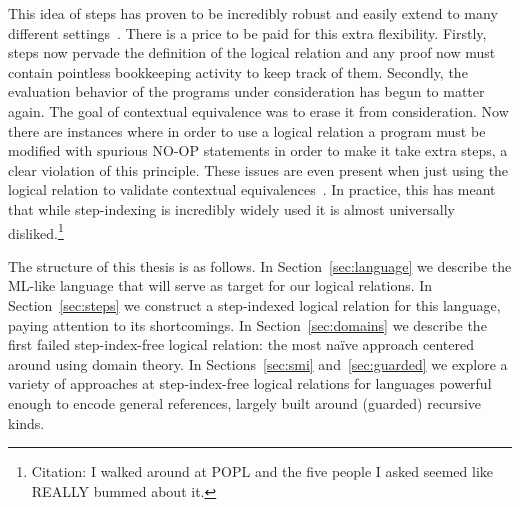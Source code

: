 This idea of steps has proven to be incredibly robust and easily
extend to many different
settings~\citep{Appel:01,Ahmed:04,Ahmed:06,Appel:07,Dreyer:09,Dreyer:10,Birkedal:steps:11,Turon:13,Svendsen:16}.
There is a price to be paid for this extra flexibility. Firstly, steps
now pervade the definition of the logical relation and any proof now
must contain pointless bookkeeping activity to keep track of
them. Secondly, the evaluation behavior of the programs under
consideration has begun to matter again. The goal of contextual
equivalence was to erase it from consideration. Now there are
instances where in order to use a logical relation a program must be
modified with spurious NO-OP statements in order to make it take extra
steps, a clear violation of this principle. These issues are even
present when just using the logical relation to validate contextual
equivalences~\citep{Svendsen:16}. In practice, this has meant that
while step-indexing is incredibly widely used it is almost universally
disliked.\footnote{Citation: I walked around at POPL and the five
  people I asked seemed like REALLY bummed about it.}

The structure of this thesis is as follows. In
Section~\ref{sec:language} we describe the ML-like language that will
serve as target for our logical relations. In Section~\ref{sec:steps}
we construct a step-indexed logical relation for this language, paying
attention to its shortcomings. In Section~\ref{sec:domains} we
describe the first failed step-index-free logical relation: the most
na\"ive approach centered around using domain theory. In
Sections~\ref{sec:smi} and~\ref{sec:guarded} we explore a variety of
approaches at step-index-free logical relations for languages powerful
enough to encode general references, largely built around (guarded)
recursive kinds.

